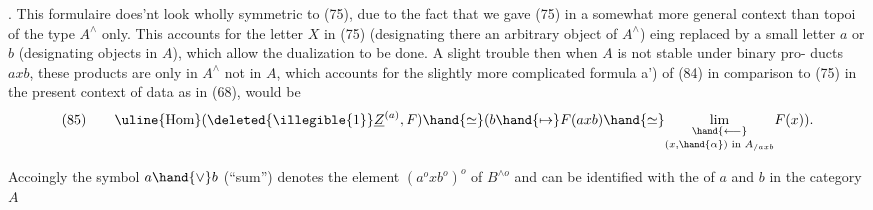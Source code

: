 \hand{\uline{\textcolor{black}{Comments}}}. This formulaire does'nt look wholly symmetric to (75), due
to the fact that we gave (75) in a  somewhat more general context
than topoi of the type $A^{\wedge}$\hand{/} only. This accounts for the letter $X$  in (75)
(designating there an arbitrary object of $A^{\wedge}$) eing replaced by a small
letter $a$ or $b$ (designating objects in $A$), which allow the dualization to
be done. A slight trouble then   when $A$ is not stable under binary pro-%
ducts $axb$,  these products are only in $A^{\wedge}$ not in $A$, which accounts
for the slightly more complicated formula a') of (84) in comparison to
(75)\hand{,} 
  in the present context of data as in (68),
would be
\[ (85)\qquad \uline{\text{Hom}}(\deleted{\illegible{1}}\underline{Z}^{(a)},F) \hand{\simeq} ( b \hand{\mapsto} F(axb) \hand{\simeq} \underset{(x,\hand{\alpha})\text{ in } A_{/axb}}{\underset{\hand{\longleftarrow}}{\mathrm{lim}}} F(x) ) . \]

Accoingly the symbol $a\hand{\vee}b$ (``sum'')  denotes the element $(a^{o}xb^{o})^{o}$
of $B^{\wedge o}$ and can be identified with the \hand{\uline{\textcolor{black}{sum}}} of $a$ and $b$ in the category $A$

